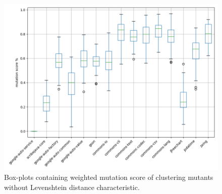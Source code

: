 \documentclass[conference,draftclsnofoot,onecolumn]{IEEEtran}
\begin{document}
\begin{figure}[ht]
\includegraphics[width=0.5 \textwidth]{images/fcm_summary/fcm_no_distance.png}
\caption{\label{box:clustering_fcm_no_distance_25}Box-plots containing weighted mutation score of clustering mutants without Levenshtein distance characteristic.}
\end{figure}
\end{document}

